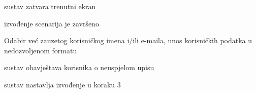 \begin{packed_item}
\begin{packed_item}
\begin{packed_enum}
								\item sustav zatvara trenutni ekran
								\item izvođenje scenarija je završeno
							\end{packed_enum}
							\item[5.a] Odabir već zauzetog korisničkog imena i/ili e-maila, unos korisničkih podatka u nedozvoljenom formatu
							\item[] \begin{packed_enum}
								
								\item sustav obavještava korisnika o neuspjelom upisu
								\item sustav nastavlja izvođenje u koraku 3
							\end{packed_enum}
							
						\end{packed_item}
					\end{packed_item}

